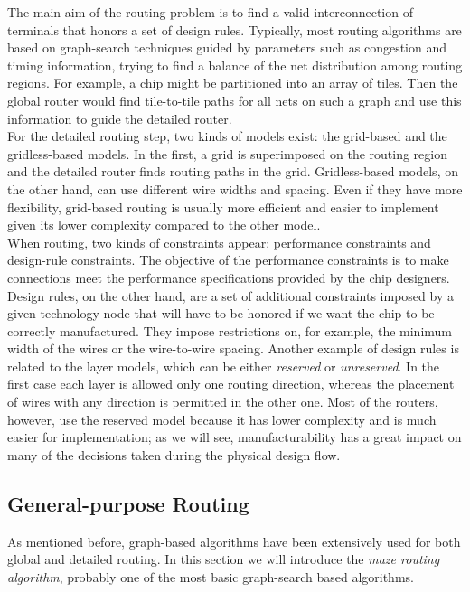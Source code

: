 The main aim of the routing problem is to find a valid interconnection of terminals that honors a set of design rules. Typically, most routing algorithms are based on graph-search techniques guided by parameters such as congestion and timing information, trying to find a balance of the net distribution among routing regions. For example, a chip might be partitioned into an array of tiles. Then the global router would find tile-to-tile paths for all nets on such a graph and use this information to guide the detailed router. \\

For the detailed routing step, two kinds of models exist: the grid-based and the gridless-based models. In the first, a grid is superimposed on the routing region and the detailed router finds routing paths in the grid. Gridless-based models, on the other hand, can use different wire widths and spacing. Even if they have more flexibility, grid-based routing is usually more efficient and easier to implement given its lower complexity compared to the other model. \\

When routing, two kinds of constraints appear: performance constraints and design-rule constraints. The objective of the performance constraints is to make connections meet the performance specifications provided by the chip designers. Design rules, on the other hand, are a set of additional constraints imposed by a given technology node that will have to be honored if we want the chip to be correctly manufactured. They impose restrictions on, for example, the minimum width of the wires or the wire-to-wire spacing. Another example of design rules is related to the layer models, which can be either \textit{reserved} or \textit{unreserved}. In the first case each layer is allowed only one routing direction, whereas the placement of wires with any direction is permitted in the other one.  Most of the routers, however, use the reserved model because it has lower complexity and is much easier for implementation; as we will see, manufacturability has a great impact on many of the decisions taken during the physical design flow. \\

\subsection{General-purpose Routing}

As mentioned before, graph-based algorithms have been extensively used for both global and detailed routing. In this section we will introduce the \textit{maze routing algorithm}, probably one of the most basic graph-search based algorithms. \\
 

